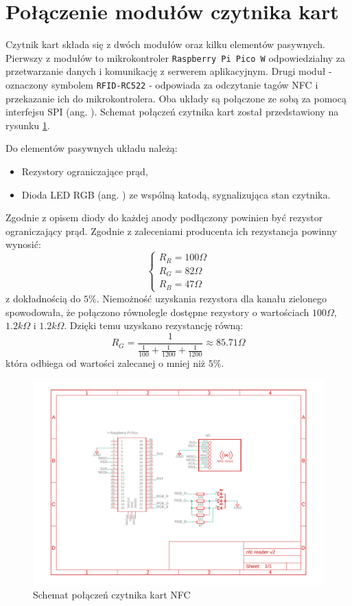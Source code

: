 \section{Połączenie modułów czytnika kart}

Czytnik kart składa się z dwóch modułów oraz kilku elementów pasywnych. Pierwszy z modułów to mikrokontroler \texttt{Raspberry Pi Pico W} odpowiedzialny za przetwarzanie danych i komunikację z serwerem aplikacyjnym. Drugi moduł - oznaczony symbolem \texttt{RFID-RC522} - odpowiada za odczytanie tagów NFC i przekazanie ich do mikrokontrolera. Oba układy są połączone ze sobą za pomocą interfejsu SPI (ang. ). Schemat połączeń czytnika kart został przedstawiony na rysunku \ref{fig:readerConnection}.

Do elementów pasywnych układu należą:
\begin{itemize}
    \item Rezystory ograniczające prąd,
    \item Dioda LED RGB (ang. ) ze wspólną katodą, sygnalizująca stan czytnika.
\end{itemize}

Zgodnie z opisem diody do każdej anody podłączony powinien być rezystor ograniczający prąd. Zgodnie z zaleceniami producenta ich rezystancja powinny wynosić:
\begin{equation}
    \begin{cases}
        R_R=100\Omega \\
        R_G=82\Omega  \\
        R_B=47\Omega
    \end{cases}
\end{equation}
z dokładnością do $5\%$. Niemożność uzyskania rezystora dla kanału zielonego spowodowała, że połączono równolegle dostępne rezystory o wartościach $100\Omega$, $1.2k\Omega$ i $1.2k\Omega$. Dzięki temu uzyskano rezystancję równą:
\begin{equation}
    R_G = \frac{1}{\frac{1}{100}+\frac{1}{1200}+\frac{1}{1200}} \approx 85.71\Omega
\end{equation}
która odbiega od wartości zalecanej o mniej niż $5\%$.
\begin{figure}[H]
    \centering
    \includegraphics[width=\textwidth]{graf/nfcReader.pdf}
    \caption{Schemat połączeń czytnika kart NFC}
    \label{fig:readerConnection}
\end{figure}